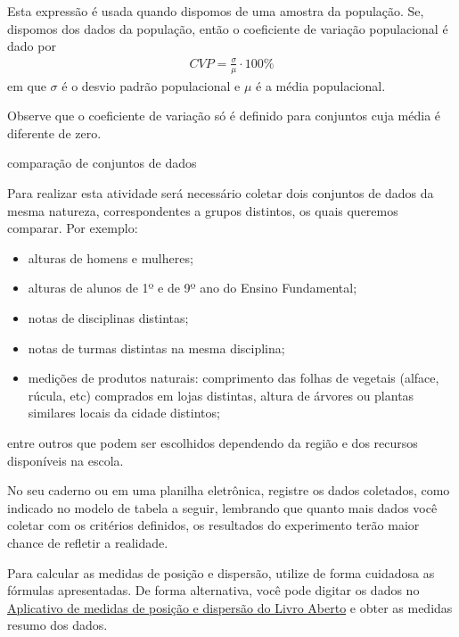 {{{Esta expressão é usada quando dispomos de uma amostra da população. Se, dispomos dos dados da população, então o coeficiente de variação populacional é dado por
\begin{equation*}
\begin{split}CVP=\frac{{\sigma}}{\mu}\cdot 100\%\end{split}
\end{equation*}
em que \(\sigma\) é o desvio padrão populacional e \(\mu\) é a média populacional.

Observe que o coeficiente de variação só é definido para conjuntos cuja média é diferente de zero.


\practice{ }
\label{\detokenize{PE104-5:sec-praticando2}}\label{\detokenize{PE104-5::doc}}\label{\detokenize{PE104-5:praticando}}\label{\detokenize{PE104-5:ativ-compara-categorias}}
\begin{task}{ comparação de conjuntos de dados}

Para realizar esta atividade será necessário coletar dois conjuntos de dados da mesma natureza, correspondentes a grupos distintos, os quais queremos comparar. Por exemplo:
\begin{itemize}
\item {} 
alturas de homens e mulheres;

\item {} 
alturas de alunos de 1º e de 9º ano do Ensino Fundamental;

\item {} 
notas de disciplinas distintas;

\item {} 
notas de turmas distintas na mesma disciplina;

\item {} 
medições de produtos naturais: comprimento das folhas de vegetais (alface, rúcula, etc) comprados em lojas distintas, altura de árvores ou plantas similares locais da cidade distintos;

\end{itemize}

entre outros que podem ser escolhidos dependendo da região e dos recursos disponíveis na escola.

No seu caderno ou em uma planilha eletrônica, registre os dados coletados, como indicado no modelo de tabela a seguir, lembrando que quanto mais dados você coletar com os critérios definidos, os resultados do experimento terão maior chance de refletir a realidade.

Para calcular as medidas de posição e dispersão, utilize de forma cuidadosa as  fórmulas apresentadas. De forma alternativa, você pode digitar os dados no \href{https://ggbm.at/KbYqnQ6Q}{Aplicativo de medidas de posição e dispersão do Livro Aberto} e obter as medidas resumo dos dados.


\end{task}}}}
